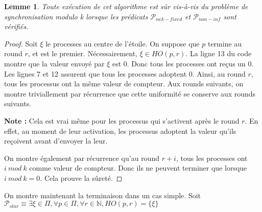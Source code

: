 \documentclass{article}
\newtheorem{lemma}{Lemme}
\begin{document}
\begin{lemma}
	Toute exécution de cet algorithme est sûr vis-à-vis du problème de synchronisation modulo k lorsque les prédicats $\mathcal{P}_{nek-fixed}$ et $\mathcal{P}_{non-inf}$ sont vérifiés.
\end{lemma}
\begin{proof}

	Soit $\xi$ le processes au centre de l'étoile.
	On suppose que $p$ termine au round $r$, et est le premier. Nécessairement, $\xi \in HO(p,r)$.
	La ligne 13 du code montre que la valeur envoyé par $\xi$ est $0$.
	Donc tous les processes ont reçus un $0$. Les lignes 7 et 12 assurent que tous les processes adoptent $0$.
	Ainsi, au round $r$, tous les processus ont la même valeur de compteur.
	Aux rounds suivants, on montre triviallement par récurrence que cette uniformité se conserve aux rounds suivants.

	\textbf{Note :} Cela est vrai même pour les processus qui s'activent après le round $r$.
	En effet, au moment de leur activation, les processus adoptent la valeur qu'ils reçoivent avant d'envoyer la leur.

	On montre également par récurrence qu'au round $r+i$, tous les processes ont $i~mod~k$ comme valeur de compteur.
	Donc ils ne peuvent terminer que lorsque $i~mod~k = 0$. Cela prouve la sûreté.

\end{proof}

On montre maintenant la terminaison dans un cas simple.
Soit $\mathcal{P}_{star} \equiv \exists \xi \in \Pi, \forall p \in \Pi, \forall r \in \mathds{N}, HO(p, r) = \{\xi\}$
\end{document}
